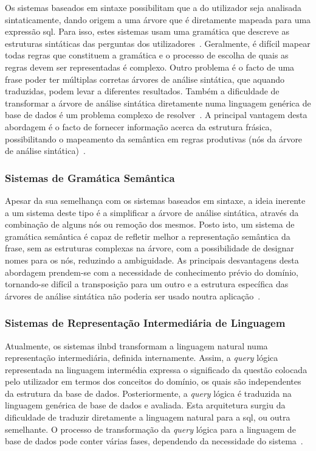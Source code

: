 Os sistemas baseados em sintaxe possibilitam que a  do utilizador seja analisada sintaticamente, dando origem a uma árvore que é diretamente mapeada para uma expressão \gls{sql}. Para isso, estes sistemas usam uma gramática que descreve as estruturas sintáticas das perguntas dos utilizadores~\parencite{nlidb_brief_review}. Geralmente, é difícil mapear todas regras que constituem a gramática e o processo de escolha de quais as regras devem ser representadas é complexo. Outro problema é o facto de uma frase poder ter múltiplas corretas árvores de análise sintática, que aquando traduzidas, podem levar a diferentes resultados. Também a dificuldade de transformar a árvore de análise sintática diretamente numa linguagem genérica de base de dados é um problema complexo de resolver~\parencite{survey_nlidb}. A principal vantagem desta abordagem é o facto de fornecer informação acerca da estrutura frásica, possibilitando o mapeamento da semântica em regras produtivas (nós da árvore de análise sintática)~\parencite{nlidb_brief_review}.

\subsubsection{Sistemas de Gramática Semântica}

Apesar da sua semelhança com os sistemas baseados em sintaxe, a ideia inerente a um sistema deste tipo é a simplificar a árvore de análise sintática, através da combinação de alguns nós ou remoção dos mesmos. Posto isto, um sistema de gramática semântica é capaz de refletir melhor a representação semântica da frase, sem as estruturas complexas na árvore, com a possibilidade de designar nomes para os nós, reduzindo a ambiguidade. As principais desvantagens desta abordagem prendem-se com a necessidade de conhecimento prévio do domínio, tornando-se difícil a transposição para um outro e a estrutura específica das árvores de análise sintática não poderia ser usado noutra aplicação~\parencite{survey_nlidb, nlidb_brief_review}.

\subsubsection{Sistemas de Representação Intermediária de Linguagem}

Atualmente, os sistemas \gls{ilnbd} transformam a linguagem natural numa representação intermediária, definida internamente. Assim, a \textit{query} lógica representada na linguagem intermédia expressa o significado da questão colocada pelo utilizador em termos dos conceitos do domínio, os quais são independentes da estrutura da base de dados. Posteriormente, a \textit{query} lógica é traduzida na linguagem genérica de base de dados e avaliada. Esta arquitetura surgiu da dificuldade de traduzir diretamente a linguagem natural para a \gls{sql}, ou outra semelhante. O processo de transformação da \textit{query} lógica para a linguagem de base de dados pode conter várias fases, dependendo da necessidade do sistema~\parencite{nlidb_brief_review}.

